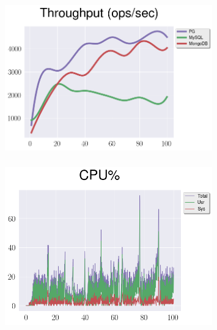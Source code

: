 \documentclass[usenames,dvipsnames, 18pt, compress, aspectratio=169]{beamer}
\begin{document}
\begin{frame}
    \frametitle{}
    \begin{center}
    \vspace{10pt}
    \begin{figure}
        \includegraphics[width=0.8\textwidth,center]{benchmarks/insert_throughput_journaled2.png}
    \end{figure}
    \end{center}
\end{frame}

\begin{frame}
    \frametitle{}
    \begin{center}
    \begin{figure}
        \includegraphics[width=0.8\textwidth,center]{benchmarks/mongodb_update_cpu_usage.png}
    \end{figure}
    \end{center}
\end{frame}
\end{document}

